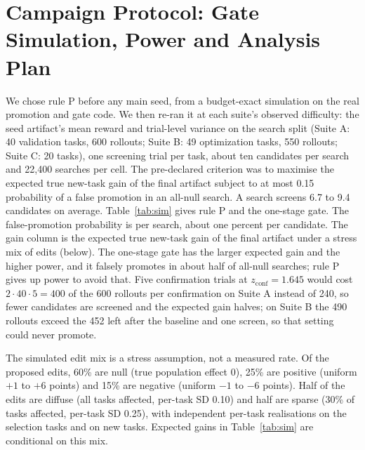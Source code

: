 \section{Campaign Protocol: Gate Simulation, Power and Analysis Plan}
\label{app:sim}

We chose rule P before any main \capevolve{} seed, from a budget-exact simulation on the real promotion and gate code. We then re-ran it at each suite's observed difficulty: the seed artifact's mean reward and trial-level variance on the search split (Suite A: 40 validation tasks, 600 rollouts; Suite B: 49 optimization tasks, 550 rollouts; Suite C: 20 tasks), one screening trial per task, about ten candidates per search and 22{,}400 searches per cell. The pre-declared criterion was to maximise the expected true new-task gain of the final artifact subject to at most 0.15 probability of a false promotion in an all-null search. A search screens 6.7 to 9.4 candidates on average. Table~\ref{tab:sim} gives rule P and the one-stage gate. The false-promotion probability is per search, about one percent per candidate. The gain column is the expected true new-task gain of the final artifact under a stress mix of edits (below). The one-stage gate has the larger expected gain and the higher power, and it falsely promotes in about half of all-null searches; rule P gives up power to avoid that. Five confirmation trials at $z_{\mathrm{conf}}=1.645$ would cost $2\cdot 40\cdot 5=400$ of the 600 rollouts per confirmation on Suite A instead of 240, so fewer candidates are screened and the expected gain halves; on Suite B the 490 rollouts exceed the 452 left after the baseline and one screen, so that setting could never promote.

\begin{table}[h]
\caption{Rule P ($n_{\mathrm{conf}}=3$, $z_{\mathrm{conf}}=1.282$) and the one-stage $k=1$ gate, per suite, from simulation at observed difficulty. False prom.\ is the probability of at least one false promotion in an all-null search of about ten candidates. The four power columns give the probability of promoting one candidate with the stated true gain. Gain is the expected true new-task gain of the final artifact.}
\label{tab:sim}
\centering\small

\end{table}

The simulated edit mix is a stress assumption, not a measured rate. Of the proposed edits, 60\% are null (true population effect 0), 25\% are positive (uniform $+1$ to $+6$ points) and 15\% are negative (uniform $-1$ to $-6$ points). Half of the edits are diffuse (all tasks affected, per-task SD 0.10) and half are sparse (30\% of tasks affected, per-task SD 0.25), with independent per-task realisations on the selection tasks and on new tasks. Expected gains in Table~\ref{tab:sim} are conditional on this mix.

